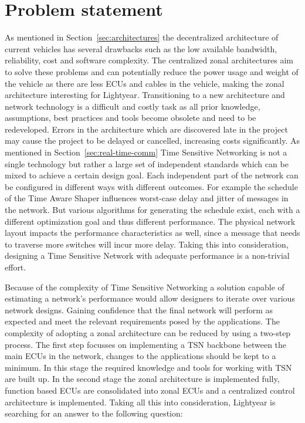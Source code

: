 \section{Problem statement}
\label{sec:problem_statement}
As mentioned in Section~\ref{sec:architectures} the decentralized architecture of current vehicles has several drawbacks such as the low available bandwidth, reliability, cost and software complexity. The centralized zonal architectures aim to solve these problems and can potentially reduce the power usage and weight of the vehicle as there are less ECUs and cables in the vehicle, making the zonal architecture interesting for Lightyear. Transitioning to a new architecture and network technology is a difficult and costly task as all prior knowledge, assumptions, best practices and tools become obsolete and need to be redeveloped. Errors in the architecture which are discovered late in the project may cause the project to be delayed or cancelled, increasing costs significantly. As mentioned in Section~\ref{sec:real-time-comm} Time Sensitive Networking is not a single technology but rather a large set of independent standards which can be mixed to achieve a certain design goal. Each independent part of the network can be configured in different ways with different outcomes. For example the schedule of the Time Aware Shaper influences worst-case delay and jitter of messages in the network. But various algorithms for generating the schedule exist, each with a different optimization goal and thus different performance. The physical network layout impacts the performance characteristics as well, since a message that needs to traverse more switches will incur more delay. Taking this into consideration, designing a Time Sensitive Network with adequate performance is a non-trivial effort.

Because of the complexity of Time Sensitive Networking a solution capable of estimating a network's performance would allow designers to iterate over various network designs. Gaining confidence that the final network will perform as expected and meet the relevant requirements posed by the applications. The complexity of adopting a zonal architecture can be reduced by using a two-step process. The first step focusses on implementing a TSN backbone between the main ECUs in the network, changes to the applications should be kept to a minimum. In this stage the required knowledge and tools for working with TSN are built up. In the second stage the zonal architecture is implemented fully, function based ECUs are consolidated into zonal ECUs and a centralized control architecture is implemented. Taking all this into consideration, Lightyear is searching for an answer to the following question:

